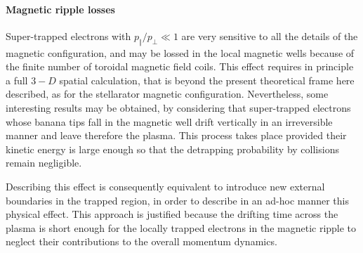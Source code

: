 \paragraph{Magnetic ripple losses}

Super-trapped electrons with $p_{\Vert }/p_{\bot }\ll 1$ are very sensitive
to all the details of the magnetic configuration, and may be lossed in the
local magnetic wells because of the finite number of toroidal magnetic field
coils. This effect requires in principle a full $3-D$ spatial calculation,
that is beyond the present theoretical frame here described, as for the
stellarator magnetic configuration. Nevertheless, some interesting results
may be obtained, by considering that super-trapped electrons whose banana
tips fall in the magnetic well drift vertically in an irreversible manner
and leave therefore the plasma. This process takes place provided their
kinetic energy is large enough so that the detrapping probability by
collisions remain negligible.

Describing this effect is consequently equivalent to introduce new external
boundaries in the trapped region, in order to describe in an ad-hoc manner
this physical effect. This approach is justified because the drifting time
across the plasma is short enough for the locally trapped electrons in the
magnetic ripple to neglect their contributions to the overall momentum
dynamics.

%

